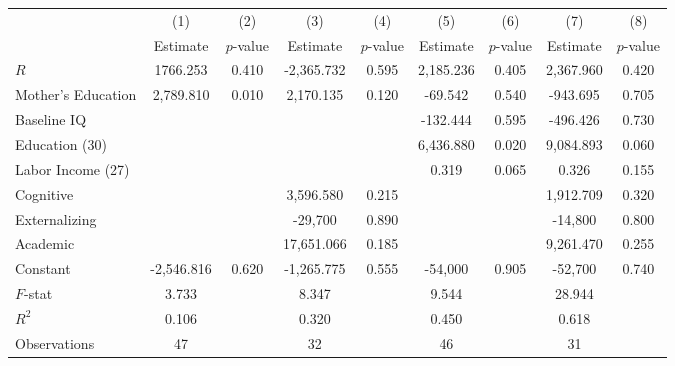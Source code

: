 \begin{tabular}{lcccccccc} \toprule
 & (1) & (2) & (3) & (4) & (5) & (6) & (7) & (8) \\ 
 & Estimate  & $p$-value  & Estimate  & $p$-value  & Estimate  & $p$-value  & Estimate  & $p$-value  \\  \midrule
$R$ &  1766.253 &     0.410 & -2,365.732 &     0.595 &  2,185.236 &     0.405 &  2,367.960 &     0.420 \\  
Mother's Education &  2,789.810 &     0.010 &  2,170.135 &     0.120 &   -69.542 &     0.540 &  -943.695 &     0.705 \\  
Baseline IQ &         &         &         &         &  -132.444 &     0.595 &  -496.426 &     0.730 \\  
Education (30) &         &         &         &         &  6,436.880 &     0.020 &  9,084.893 &     0.060 \\  
Labor Income (27) &         &         &         &         &     0.319 &     0.065 &     0.326 &     0.155 \\  
Cognitive &         &         &  3,596.580 &     0.215 &         &         &  1,912.709 &     0.320 \\  
Externalizing &         &         & -29,700 &     0.890 &         &         & -14,800 &     0.800 \\  
Academic &         &         & 17,651.066 &     0.185 &         &         &  9,261.470 &     0.255 \\  
Constant & -2,546.816 &     0.620 & -1,265.775 &     0.555 & -54,000 &     0.905 & -52,700 &     0.740 \\  \midrule
$F$-stat &     3.733 &         &     8.347 &         &     9.544 &         &    28.944 &         \\  
$R^2$ &     0.106 &         &     0.320 &         &     0.450 &         &     0.618 &         \\  
Observations &    47 &         &    32 &         &    46 &         &    31 &         \\  
\bottomrule
\end{tabular}


